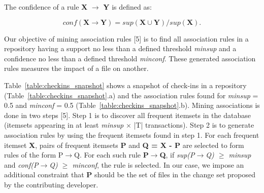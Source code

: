 The confidence of a rule \textbf{X} $\rightarrow$ \textbf{Y} is defined as:

\begin{equation}
conf(\textbf{X} \rightarrow \textbf{Y}) = \textit{sup}(\textbf{X}\cup\textbf{Y}) / \textit{sup}(\textbf{X}). 
\end{equation}

Our objective of mining association rules [5] is to find all association rules in a repository having a support no less than a defined threshold \textit{minsup} and a confidence no less
than a defined threshold \textit{minconf}. These generated association rules measures the impact of a file on another.

Table~\ref{table:checkins_snapshot} shows a snapshot of check-ins in a repository (Table~\ref{table:checkins_snapshot}.a) and the association rules found for \textit{minsup} = 0.5 and \textit{minconf} = 0.5 (Table~\ref{table:checkins_snapshot}.b). Mining associations is done in two steps [5]. Step 1 is to discover all frequent itemsets in the database (itemsets appearing in at least \textit{minsup} $\times$ |T| transactions). Step 2 is to generate association rules by using the frequent itemsets found in step 1. For each frequent itemset \textbf{X}, pairs of frequent itemsets \textbf{P} and \textbf{Q = X - P} are selected to form rules of the form P$\rightarrow$Q. For each such rule \textbf{P$\rightarrow$Q}, if \textit{sup(P$\rightarrow$Q) $\ge$ minsup} and \textit{conf(P$\rightarrow$Q) $\ge$ minconf}, the rule is selected. In our case, we impose an additional constraint that \textbf{P} should be the set of files in the change set proposed by the contributing developer.

